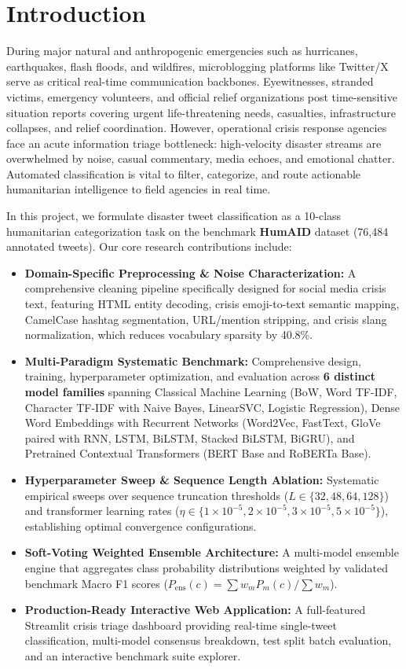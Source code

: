 \documentclass[12pt,a4paper]{article}
\begin{document}
\section{Introduction}
During major natural and anthropogenic emergencies such as hurricanes, earthquakes, flash floods, and wildfires, microblogging platforms like Twitter/X serve as critical real-time communication backbones. Eyewitnesses, stranded victims, emergency volunteers, and official relief organizations post time-sensitive situation reports covering urgent life-threatening needs, casualties, infrastructure collapses, and relief coordination. However, operational crisis response agencies face an acute information triage bottleneck: high-velocity disaster streams are overwhelmed by noise, casual commentary, media echoes, and emotional chatter. Automated classification is vital to filter, categorize, and route actionable humanitarian intelligence to field agencies in real time.

In this project, we formulate disaster tweet classification as a 10-class humanitarian categorization task on the benchmark \textbf{HumAID} dataset (76,484 annotated tweets). Our core research contributions include:
\begin{itemize}
    \item \textbf{Domain-Specific Preprocessing \& Noise Characterization:} A comprehensive cleaning pipeline specifically designed for social media crisis text, featuring HTML entity decoding, crisis emoji-to-text semantic mapping, CamelCase hashtag segmentation, URL/mention stripping, and crisis slang normalization, which reduces vocabulary sparsity by 40.8\%.
    \item \textbf{Multi-Paradigm Systematic Benchmark:} Comprehensive design, training, hyperparameter optimization, and evaluation across \textbf{6 distinct model families} spanning Classical Machine Learning (BoW, Word TF-IDF, Character TF-IDF with Naive Bayes, LinearSVC, Logistic Regression), Dense Word Embeddings with Recurrent Networks (Word2Vec, FastText, GloVe paired with RNN, LSTM, BiLSTM, Stacked BiLSTM, BiGRU), and Pretrained Contextual Transformers (BERT Base and RoBERTa Base).
    \item \textbf{Hyperparameter Sweep \& Sequence Length Ablation:} Systematic empirical sweeps over sequence truncation thresholds ($L \in \{32, 48, 64, 128\}$) and transformer learning rates ($\eta \in \{1\times 10^{-5}, 2\times 10^{-5}, 3\times 10^{-5}, 5\times 10^{-5}\}$), establishing optimal convergence configurations.
    \item \textbf{Soft-Voting Weighted Ensemble Architecture:} A multi-model ensemble engine that aggregates class probability distributions weighted by validated benchmark Macro F1 scores ($P_{\text{ens}}(c) = \sum w_m P_m(c) / \sum w_m$).
    \item \textbf{Production-Ready Interactive Web Application:} A full-featured Streamlit crisis triage dashboard providing real-time single-tweet classification, multi-model consensus breakdown, test split batch evaluation, and an interactive benchmark suite explorer.
\end{itemize}
\end{document}
